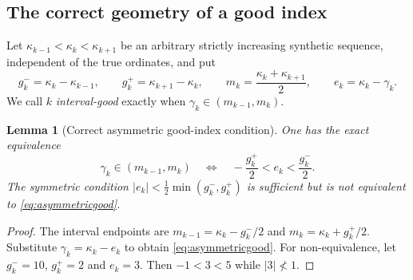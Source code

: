 \documentclass[11pt,reqno]{amsart}
\numberwithin{equation}{section}
\newtheorem{lemma}[theorem]{Lemma}
\begin{document}
\subsection{The correct geometry of a good index}
Let $\kappa_{k-1}<\kappa_k<\kappa_{k+1}$ be an arbitrary strictly
increasing synthetic sequence, independent of the true ordinates, and put
\[
g_k^- =\kappa_k-\kappa_{k-1},\qquad
 g_k^+=\kappa_{k+1}-\kappa_k,
\qquad m_k=\frac{\kappa_k+\kappa_{k+1}}2,
\qquad e_k=\kappa_k-\gamma_k.
\]
We call $k$ \emph{interval-good} exactly when
$\gamma_k\in(m_{k-1},m_k)$.
\begin{lemma}[Correct asymmetric good-index condition]
\label{lem:asymmetricgood}
One has the exact equivalence
\begin{equation}\label{eq:asymmetricgood}
\gamma_k\in(m_{k-1},m_k)
\quad\Longleftrightarrow\quad
-\frac{g_k^+}{2}<e_k<\frac{g_k^-}{2}.
\end{equation}
The symmetric condition
$|e_k|<\frac12\min(g_k^-,g_k^+)$ is sufficient but is
\emph{not} equivalent to \eqref{eq:asymmetricgood}.
\end{lemma}
\begin{proof}
The interval endpoints are
$m_{k-1}=\kappa_k-g_k^-/2$ and
$m_k=\kappa_k+g_k^+/2$.
Substitute $\gamma_k=\kappa_k-e_k$ to obtain
\eqref{eq:asymmetricgood}. For non-equivalence, let
$g_k^-=10$, $g_k^+=2$ and $e_k=3$. Then
$-1<3<5$ while $|3|\not<1$.
\end{proof}
\end{document}
